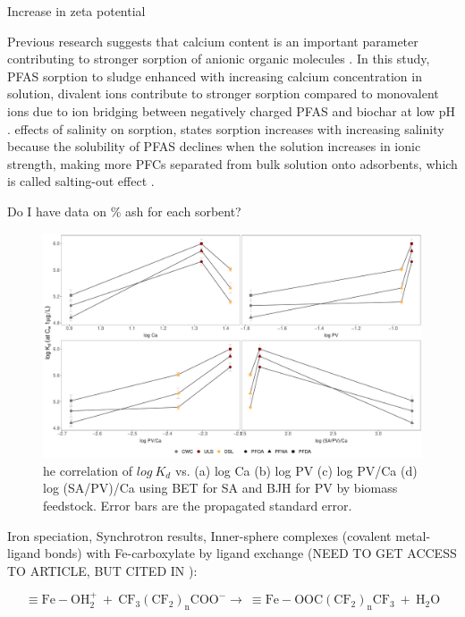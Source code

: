 Increase in zeta potential 

Previous research suggests that calcium content is an important parameter contributing to stronger sorption of anionic organic molecules \citep{higgins2006sorption,sigmund2022sorption}. In this study, PFAS sorption to sludge enhanced with increasing calcium concentration in solution, divalent ions contribute to stronger sorption compared to monovalent ions due to ion bridging between negatively charged PFAS and biochar at low pH \citep{zhang2013sorption,arvaniti2014sorption,arvaniti2015review}. 
\citep{yin2022insights,du2014adsorption} effects of salinity on sorption, states sorption increases with increasing salinity because the solubility of PFAS declines when the solution increases in ionic strength, making more PFCs separated from bulk solution onto adsorbents, which is called salting-out effect . 

Do I have data on \% ash for each sorbent?
\begin{figure}
    \centering
    \includegraphics[width=\textwidth]{R/figs/Correlation_SAPV_Ca_plot.pdf}
    \caption{he correlation of $log~K_d$ vs. (a) log Ca (b) log PV (c) log PV/Ca (d) log (SA/PV)/Ca using BET for SA and BJH for PV by biomass feedstock. Error bars are the propagated standard error.}
    \label{fig:Kd_SAPV_Ca}
\end{figure}


Iron speciation, Synchrotron results, Inner-sphere complexes (covalent metal-ligand bonds) with Fe-carboxylate by ligand exchange \citep{gao2012adsorption}(NEED TO GET ACCESS TO ARTICLE, BUT CITED IN \citep{du2014adsorption}):

\begin{equation}
    \mathrm{\equiv Fe-OH_2^+~ + ~ CF_3(CF_2)_nCOO^- \rightarrow   ~ \equiv Fe-OOC(CF_2)_nCF_3 ~+~ H_2O}
\end{equation}

